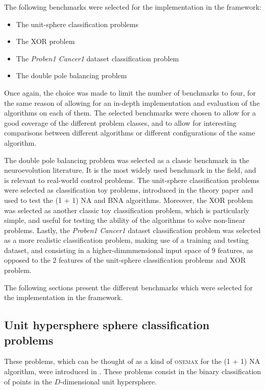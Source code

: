 The following benchmarks were selected for the implementation in the framework:

\begin{itemize}
    \item The unit-sphere classification problems
    \item The XOR problem
    \item The \textit{Proben1 Cancer1} dataset classification problem
    \item The double pole balancing problem
\end{itemize}

Once again, the choice was made to limit the number of benchmarks to four, for the same reason of allowing for an in-depth implementation and evaluation of the algorithms on each of them.
The selected benchmarks were chosen to allow for a good coverage of the different problem classes, and to allow for interesting comparisons between different algorithms or different
configurations of the same algorithm.

The double pole balancing problem was selected as a classic benchmark in the neuroevolution literature. It is the most widely used benchmark in the field, and is relevant to real-world
control problems. The unit-sphere classification problems were selected as classification toy problems, introduced in the theory paper \cite{na} and used to test the (1 + 1) NA and BNA algorithms.
Moreover, the XOR problem was selected as another classic toy classification problem, which is particularly simple, and useful for testing the ability of the algorithms to solve non-linear problems.
Lastly, the \textit{Proben1 Cancer1} dataset classification problem was selected as a more realistic classification problem, making use of a training and testing dataset, and consisting
in a higher-dimmmensional input space of $9$ features, as opposed to the $2$ features of the unit-sphere classification problems and XOR problem.

The following sections present the different benchmarks which were selected for the implementation in the framework.

\subsection{Unit hypersphere sphere classification problems}
\label{subsection:sphere_classification}

These problems, which can be thought of as a kind of \textsc{onemax} for the (1 + 1) NA algorithm, were introduced in \cite{na}.
These problems consist in the binary classification of points in the $D$-dimensional unit hypersphere.

